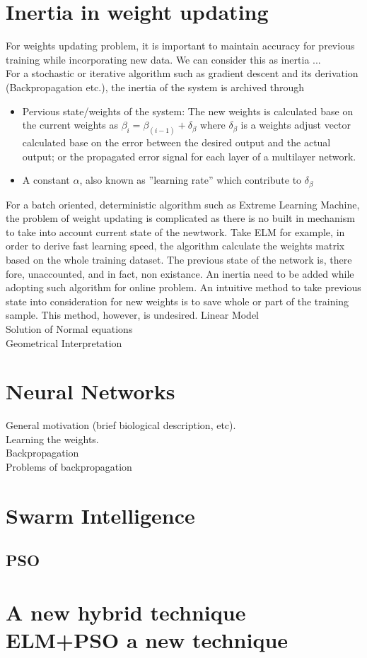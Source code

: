 \documentclass[11pt]{article}
\begin{document}
\section{Inertia in weight updating}
For weights updating problem, it is important to maintain accuracy for previous training while incorporating new data. We can consider this as inertia ...\\
For a stochastic or iterative algorithm such as gradient descent and its derivation (Backpropagation etc.), the inertia of the system is archived through
\begin{itemize}
\item Pervious state/weights of the system: The new weights is calculated base on the current weights as $\beta_i = \beta_(i-1) + \delta_\beta$ where $\delta_\beta$ is a weights adjust vector calculated base on the error between the desired output and the actual output; or the propagated error signal for each layer of a multilayer network.
\item A constant $\alpha$, also known as ''learning rate'' which contribute to $\delta_\beta$
\end{itemize}
For a batch oriented, deterministic algorithm such as Extreme Learning Machine, the problem of weight updating is complicated as there is no built in mechanism to take into account current state of the newtwork. Take ELM for example, in order to derive fast learning speed, the algorithm calculate the weights matrix based on the whole training dataset. The previous state of the network is, there fore, unaccounted, and in fact, non existance. An inertia need to be added while adopting such algorithm for online problem.
An intuitive method to take previous state into consideration for new weights is to save whole or part of the training sample. This method, however, is undesired. 
Linear Model\\
Solution of Normal equations\\
Geometrical Interpretation\\

\section{Neural Networks}
General motivation (brief biological description, etc).\\
Learning the weights.\\
Backpropagation\\
Problems of backpropagation\\

\section{Swarm Intelligence}
\subsection{PSO}

\section{A new hybrid technique ELM+PSO a new technique}

%

\end{document}
